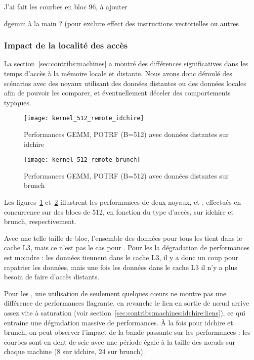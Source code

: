 \begin{todo}
  J'ai fait les courbes en bloc 96, à ajouter
\end{todo}

\begin{todo}
  dgemm à la main ? (pour exclure effect des instructions vectorielles ou autres
\end{todo}

\subsubsection{Impact de la localité des accès}\label{sec:contribs:apps:cholesky:locality}

La section~\ref{sec:contribs:machines} a montré des différences significatives dans les temps d'accès à la mémoire locale et distante.
Nous avons donc déroulé des scénarios avec des noyaux utilisant des données distantes ou des données locales afin de pouvoir les comparer, et éventuellement déceler des comportements typiques.

\begin{figure}[t!]
  \centering
  \texttt{[image: kernel\_512\_remote\_idchire]}
  \caption{Performances GEMM, POTRF (B=512) avec données distantes sur idchire}\label{fig:contribs:apps:cholesky:perf-512-remote-idchire}
\end{figure}
\begin{figure}[h!]
  \centering
  \texttt{[image: kernel\_512\_remote\_brunch]}
  \caption{Performances GEMM, POTRF (B=512) avec données distantes sur brunch}\label{fig:contribs:apps:cholesky:perf-512-remote-brunch}
\end{figure}

Les figures~\ref{fig:contribs:apps:cholesky:perf-512-remote-idchire} et~\ref{fig:contribs:apps:cholesky:perf-512-remote-brunch} illustrent les performances de deux noyaux, \gemm et \potrf, effectués en concurrence sur des blocs de 512, en fonction du type d'accès, sur idchire et brunch, respectivement.

Avec une telle taille de bloc, l'ensemble des données pour tous les \potrf tient dans le cache L3, mais ce n'est pas le cas pour \gemm.
Pour les \potrf la dégradation de performances est moindre : les données tiennent dans le cache L3, il y a donc un coup pour rapatrier les données, mais une fois les données dans le cache L3 il n'y a plus besoin de faire d'accès distants.

Pour les \gemm, une utilisation de seulement quelques cœurs ne montre pas une différence de performances flagrante, en revanche le lien en sortie de nœud arrive assez vite à saturation (voir section~\ref{sec:contribs:machines:idchire:liens}), ce qui entraine une dégradation massive de performances.
À la fois pour idchire et brunch, on peut observer l'impact de la bande passante sur les performances : les courbes sont en dent de scie avec une période égale à la taille des nœuds sur chaque machine (8 sur idchire, 24 sur brunch).

